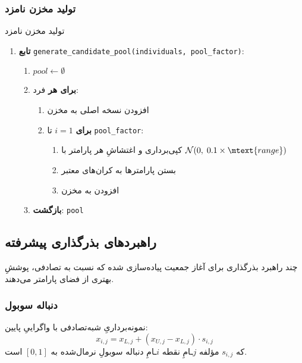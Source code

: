 \subsubsection{تولید مخزن نامزد}

\begin{algorithm}
\caption{تولید مخزن نامزد}
\begin{enumerate}
\item \textbf{تابع} \texttt{generate\_candidate\_pool(individuals, pool\_factor)}:
  \begin{enumerate}
  \item \(pool \leftarrow \emptyset\)
  \item \textbf{برای هر} فرد:
    \begin{enumerate}
    \item افزودن نسخه اصلی به مخزن
    \item \textbf{برای} \(i=1\) تا \texttt{pool\_factor}:
      \begin{enumerate}
      \item کپی‌برداری و اغتشاشِ هر پارامتر با \(\mathcal{N}(0,\; 0.1\times \mtext{range})\)
      \item بستن پارامترها به کران‌های معتبر
      \item افزودن به مخزن
      \end{enumerate}
    \end{enumerate}
  \item \textbf{بازگشت}: \texttt{pool}
  \end{enumerate}
\end{enumerate}
\end{algorithm}

\subsection{راهبردهای بذرگذاری پیشرفته}

چند راهبرد بذرگذاری برای آغاز جمعیت پیاده‌سازی شده که نسبت به تصادفی، پوششِ بهتری از فضای پارامتر می‌دهند.

\subsubsection{دنباله سوبول}

نمونه‌برداریِ شبه‌تصادفی با واگراییِ پایین:
\begin{equation}\label{Eq.sobol_sequence}
x_{i,j} = x_{L,j} + (x_{U,j} - x_{L,j}) \cdot s_{i,j}
\end{equation}
که \(s_{i,j}\) مؤلفه \(j\)ـامِ نقطه \(i\)ـامِ دنباله سوبولِ نرمال‌شده به \([0,1]\) است.

